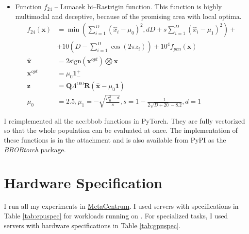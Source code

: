 \begin{itemize}
\begin{align*}
\begin{array}{ll}
\begin{array}{l}
                    \end{array}
            \end{array}
        \right.
    \end{align*}
    \item Function $f_{24}$ -- Lunacek bi--Rastrigin function. This function is highly multimodal and deceptive, because of the promising area with local optima.
    \begin{align*}
        f_{24}\left(\mathbf{x}\right) &=
            \min\left( \sum_{i=1}^D\left(\hat{x}_i-\mu_0\right)^2, dD+s\sum_{i=1}^D\left(\hat{x}_i-\mu_1\right)^2 \right) + \\
            &+ 10\left(D-\sum_{i=1}^D \cos\left(2\pi z_i\right)\right)
            + 10^4 f_{pen}\left(\mathbf{x}\right) \\
        \hat{\mathbf{x}} &= 2 \text{sign}\left(\mathbf{x}^{opt}\right) \bigotimes \mathbf{x} \\
        \mathbf{x}^{opt} &= \mu_0 \mathbf{1}^{+}_{-} \\
        \mathbf{z} &= \mathbf{Q}\Lambda^{100}\mathbf{R}\left(\hat{\mathbf{x}}-\mu_0\mathbf{1}\right) \\
        \mu_0&=2.5,\mu_1=-\sqrt{\frac{\mu_0^2-d}{s}}, s=1-\frac{1}{2\sqrt{D+20}-8.2},d=1
    \end{align*}
\end{itemize}

I reimplemented all the \acrshort{acc:bbob} functions in PyTorch. They are fully vectorized so that the whole population can be evaluated at once. The implementation of these functions is in the attachment and is also available from PyPI as the \href{https://pypi.org/project/BBOBtorch/}{\textit{BBOBtorch}} package.




\section{Hardware Specification}

I run all my experiments in \href{https://metavo.metacentrum.cz/en/}{MetaCentrum}. I used servers with specifications in Table \ref{tab:cpuspec} for workloads running on \cpuns. For \gpu specialized tasks, I used servers with hardware specifications in Table \ref{tab:gpuspec}.


